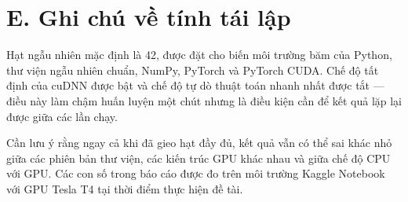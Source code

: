 \section*{E. Ghi chú về tính tái lập}

Hạt ngẫu nhiên mặc định là 42, được đặt cho biến môi trường băm của Python, thư viện ngẫu nhiên
chuẩn, NumPy, PyTorch và PyTorch CUDA. Chế độ tất định của cuDNN được bật và chế độ tự dò thuật
toán nhanh nhất được tắt --- điều này làm chậm huấn luyện một chút nhưng là điều kiện cần để kết
quả lặp lại được giữa các lần chạy.

Cần lưu ý rằng ngay cả khi đã gieo hạt đầy đủ, kết quả vẫn có thể sai khác nhỏ giữa các phiên bản
thư viện, các kiến trúc GPU khác nhau và giữa chế độ CPU với GPU. Các con số trong báo cáo được đo
trên môi trường Kaggle Notebook với GPU Tesla T4 tại thời điểm thực hiện đề tài.
